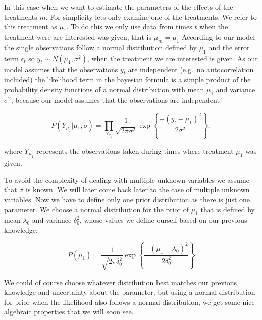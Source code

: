 \documentclass[12pt,a4paper,leqno]{report}
\theoremstyle{plain}
\theoremstyle{definition}
\theoremstyle{remark}
\begin{document}
In this case when we want to estimate the parameters of the effects of the treatments \(m\).
For simplicity lets only examine one of the treatments. We refer to this treatment as \(\mu_1 \).
To do this we only use data from times \(t\) when the treatment were are interested was given, that is \(\mu_m=\mu_1\)
According to our model the single observations follow a normal distribution defined by \(\mu_1 \)
and the error term \(\epsilon_t \) so \(y_t \sim N(\mu_1,\sigma^2) \), when the treatment we are
interested is given. As our model assumes that the observations \(y_t\) are independent
(e.g.\ no autocorrelation included) the likelihood term in the bayesian
formula is a simple product of the probability density functions of
a normal distribution with mean \(\mu_1 \) and variance \(\sigma^2 \), because our model assumes
that the observations are independent

\begin{def}\label{}
\begin{equation}\label{}
    P(Y_{\mu_1}|\mu_1, \sigma)
    =
    \prod_{Y_{\mu_1}}
    \frac{1}
    {{\sqrt {2\pi \sigma^2} }}
    \exp{
        \left \{
            \frac{-(y_t - \mu_1)^2}
            {2\sigma^2}
        \right \}
    },
\end{equation}
\end{def}where \(Y_{\mu_1}\) represents the observations taken during times where treatment \(\mu_1\)
was given.

To avoid the complexity of dealing with multiple unknown variables we assume
that \(\sigma \) is known. We will later come back later to the case of multiple unknown variables.
Now we have to define only one prior distribution as there is just one parameter.
We choose a normal distribution for the prior of \(\mu_1\) that is defined by mean \(\lambda_0 \)
and variance \(\delta_0^2 \), whose values we define ourself based on
our previous knowledge:

\begin{def}\label{}
\begin{equation}\label{}
    P(\mu_1)
    =
    \frac{1}
    {{\sqrt {2\pi \delta_0^2} }}
    \exp{
        \left \{
            \frac{
            -(\mu_1 - \lambda_0)^2
            }
            {2\delta_0^2}
        \right \}
    }
\end{equation}
\end{def}

We could of course choose whatever distribution best
matches our previous knowledge and uncertainty about the parameter,
but using a normal distribution for prior when the likelihood also follows a normal distribution,
we get some nice algebraic properties that we will soon see.
\end{document}
